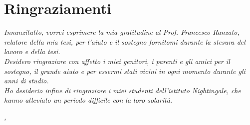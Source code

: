 
\cleardoublepage
{}
{}

\bigskip

\begingroup
\let\clearpage\relax
\let\cleardoublepage\relax
\let\cleardoublepage\relax

\chapter*{Ringraziamenti}

\noindent \textit{Innanzitutto, vorrei esprimere la mia gratitudine al Prof. Francesco Ranzato, relatore della mia tesi, per l'aiuto e il sostegno fornitomi durante la stesura del lavoro e della tesi.}\\

\noindent \textit{Desidero ringraziare con affetto i miei genitori, i parenti e gli amici per il sostegno, il grande aiuto e per essermi stati vicini in ogni momento durante gli anni di studio.}\\

\noindent \textit{Ho desiderio infine di ringraziare i miei studenti dell'istituto Nightingale, che hanno alleviato un periodo difficile con la loro solarità.}\\
\bigskip

\noindent\textit{\myLocation, \myTime}
\hfill \myName

\endgroup

